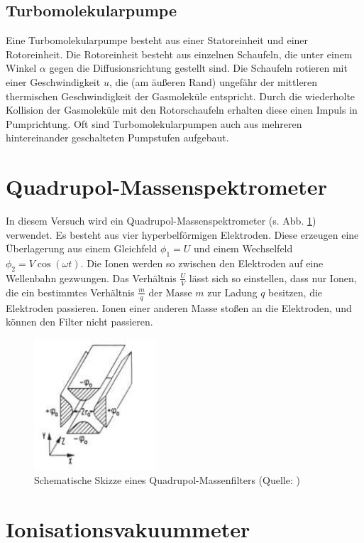 \subsection{Turbomolekularpumpe}

Eine Turbomolekularpumpe besteht aus einer Statoreinheit und einer Rotoreinheit. Die Rotoreinheit besteht aus einzelnen Schaufeln, die unter einem Winkel $\alpha$ gegen die Diffusionsrichtung gestellt sind.
Die Schaufeln rotieren mit einer Geschwindigkeit $u$, die (am äußeren Rand) ungefähr der mittleren thermischen Geschwindigkeit der Gasmoleküle entspricht. Durch die wiederholte Kollision der Gasmoleküle mit den Rotorschaufeln erhalten diese einen Impuls in Pumprichtung.
Oft sind Turbomolekularpumpen auch aus mehreren hintereinander geschalteten Pumpstufen aufgebaut.

\section{Quadrupol-Massenspektrometer}

In diesem Versuch wird ein Quadrupol-Massenspektrometer (s. Abb. \ref{fig021}) verwendet. Es besteht aus vier hyperbelförmigen Elektroden. Diese erzeugen eine Überlagerung aus einem Gleichfeld $\phi_{1}=U$ und einem Wechselfeld $\phi_{2}=V\cos(\omega t)$.
Die Ionen werden so zwischen den Elektroden auf eine Wellenbahn gezwungen. Das Verhältnis $\frac{U}{V}$ lässt sich so einstellen, dass nur Ionen, die ein bestimmtes Verhältnis $\frac{m}{q}$ der Masse $m$ zur Ladung $q$ besitzen, die Elektroden passieren. Ionen einer anderen Masse stoßen an die Elektroden, und können den Filter nicht passieren.

\begin{figure}[tb]
 \centering
 \includegraphics[scale=0.9]{./fig/massenspek_quadrupol.png}
 \caption{Schematische Skizze eines Quadrupol-Massenfilters (Quelle: \cite[S. 25]{Litmap})}
 \label{fig021}
\end{figure}

\section{Ionisationsvakuummeter}

